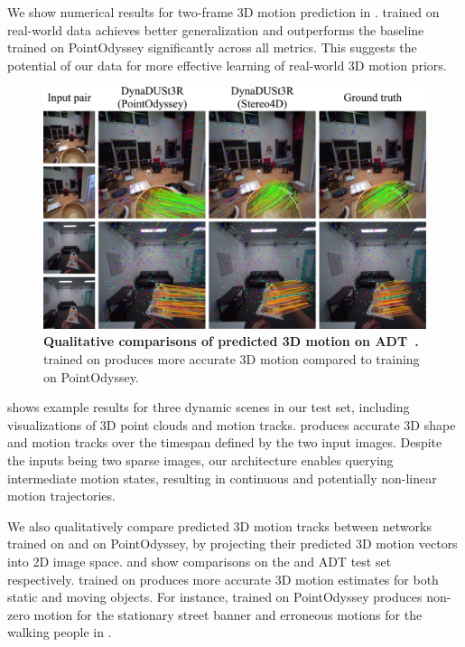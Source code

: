 We show numerical results for two-frame 3D motion prediction 
in . 
\method trained on real-world data achieves better generalization and outperforms the baseline trained on PointOdyssey significantly across all 
metrics. This suggests the potential of our data for more effective learning of real-world 3D motion priors.



\begin{figure}[ht]
    \centering
    \includegraphics[width=\linewidth]{fig/tapvid3d_adt.pdf}
    \caption{\textbf{Qualitative comparisons of predicted 3D motion on ADT~\cite{pan2023aria}.} \method trained on \dataset produces more accurate 3D motion compared to training on PointOdyssey.} %
    \label{fig:compare-stereo4d-adt}
\end{figure}

 shows example results for three dynamic scenes in our \dataset test set, including visualizations of 3D point clouds and motion tracks.
\method produces accurate 3D shape and motion tracks over the timespan defined by the two input images. Despite the inputs being two sparse images, our architecture enables querying intermediate motion states, resulting in continuous and potentially non-linear motion trajectories.%

We also qualitatively compare predicted 3D motion tracks between \method networks trained on \dataset and on PointOdyssey, by projecting their predicted 3D motion vectors into 2D image space.
 and  show comparisons on the \dataset and ADT test set respectively. \method trained on \dataset produces more accurate 3D motion estimates for both static and moving objects. For instance, \method trained on PointOdyssey produces non-zero motion for the stationary street banner and erroneous motions for the walking people in .










